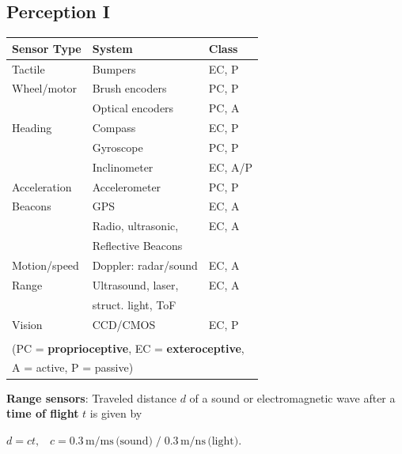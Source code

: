 \documentclass[landscape]{article}
\newcommand{\vmspace}{\vspace{-7pt}}
\newcommand{\vpspace}{\vspace{5pt}}
\newcommand{\vtspace}{\vspace{-10pt}}
\begin{document}
\begin{multicols}{3}

\vtspace

\section{Perception I}
\vmspace

\begin{minipage}{\columnwidth}
  \begin{center}
    \begin{tabular}{lll}\toprule
      \textbf{Sensor Type} & \textbf{System} & \textbf{Class} \\\hline
      Tactile & Bumpers & EC, P \\
      Wheel/motor & Brush encoders & PC, P \\
      & Optical encoders & PC, A \\
      Heading & Compass & EC, P \\
      & Gyroscope & PC, P \\
      & Inclinometer & EC, A/P \\
      Acceleration & Accelerometer & PC, P \\
      Beacons & GPS & EC, A \\
              & Radio, ultrasonic, & EC, A \\
              & Reflective Beacons \\
      Motion/speed & Doppler: radar/sound & EC, A \\
      Range & Ultrasound, laser, & EC, A \\
            & struct. light, ToF \\
      Vision & CCD/CMOS & EC, P \\
      \bottomrule
      \\[-10pt]
      \multicolumn{3}{l}{(PC = \textbf{proprioceptive}, EC =
      \textbf{exteroceptive},} \\
      \multicolumn{3}{l}{A = active, P = passive)}
    \end{tabular}
  \end{center}
\end{minipage}

\vpspace

\begin{minipage}{\columnwidth}
  \textbf{Range sensors}: Traveled distance $d$ of a sound or electromagnetic
  wave after a \textbf{time of flight} $t$ is given by
  \vmspace
  \begin{center}
    $d=ct,\;\;\; c = 0.3\,\mathrm m / \mathrm{ms}\,\text{(sound)} \; / \;
    0.3\,\mathrm m / \mathrm{ns}\,\text{(light)}.$
  \end{center}
\end{minipage}


\end{multicols}
\end{document}
